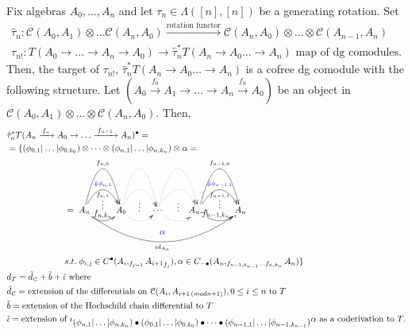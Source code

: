 %
%
\begin{eg}
\label{eg:pb5}
Fix algebras $A_0, \dots, A_n$ and let 
$\tau_n \in \Lambda([n],[n])$ 
be a generating rotation. Set
\begin{align*}
\hat{\tau}_n:
\mathcal{C}(A_0,A_1) \otimes 
\dots \mathcal{C}(A_n,A_0) 
\xrightarrow{\textrm{rotation functor}}
\mathcal{C}(A_n,A_0) \otimes 
\dots \otimes \mathcal{C}(A_{n-1},A_n)\\
\tau_{n!}: T(A_0 \to \dots \to A_n \to A_0)
\to \hat{\tau}_n^* T(A_n \to A_0 \dots \to A_n) 
\textrm{ map of dg comodules.}
\end{align*}
Then, the target of $\tau_{n!}$, 
$\hat{\tau}_n^* T(A_n \to A_0 \dots \to A_n)$ 
is a cofree dg comodule with the following 
structure. Let 
$(A_0 \xrightarrow{f_0} A_1 \to \dots \to 
A_n \xrightarrow{f_n} A_0)$ be an object 
in $\mathcal{C}(A_0,A_1) \otimes \dots \otimes 
\mathcal{C}(A_n, A_0)$. Then,
\begin{align*}
&\hat{\tau}_n^* 
  T(A_n \xrightarrow{f_n} A_0 \to \dots 
  \xrightarrow{f_{n-1}} A_n)^\bullet = \\
&= \{
  (\phi_{0,1}|\dots|\phi_{0,k_0}) \otimes \dots \otimes
  (\phi_{n,1}|\dots|\phi_{n,k_n}) \otimes \alpha = \\
&\phantom{moveovermove} =
  \xymatrix{
  A_n \ar@/^4pc/[r]^{f_{n,0}} 
  \ar@/^2pc/[r]^{\textcolor{blue}{\Downarrow \phi_{n,1}}}_{f_{n,1}} 
  \ar@/_1pc/[r]^{\substack{\textcolor{blue}{\vdots}\\ f_{n,k_n}}}
  \ar@/_3pc/[rrrr]^{\substack{\textcolor{blue}{\alpha} \\\\}}_{ id_{A_n}}
  & A_0 \ar@{.>}@/^4pc/[r] 
  \ar@{.>}@/^2pc/[r]_{\substack{\\ \\ \textcolor{blue}{\vdots}}} 
  \ar@{.>}@/_1pc/[r]
  & \cdots \ar@{.>}@/^4pc/[r] 
  \ar@{.>}@/^2pc/[r]_{\substack{\\ \\ \textcolor{blue}{\vdots}}} 
  \ar@{.>}@/_1pc/[r]
  & A_{n-1} \ar@/^4pc/[r]^{f_{n-1,0}} 
  \ar@/^2pc/[r]^{\textcolor{blue}{\Downarrow \phi_{n-1,1}}}_{f_{n-1,1}} 
  \ar@/_1pc/[r]^{\substack{\textcolor{blue}{\vdots}\\ f_{n-1,k_{n-1}}}}
  & A_n 
  }\\
&\phantom{moveovermove}
   s.t.\; \phi_{i,j} \in C^\bullet(A_i, _{f_{j-1}} {A_{i+1}}_{f_j}),
    \alpha \in C_{-\bullet}(A_n, _{f_{n-1,k_{n-1}}\dots f_{n,k_n}} A_n)\}\\
&d_{T} = 
  \tilde{d}_{\mathcal{C}} + \tilde{b} + \tilde{\iota} 
  \textrm{ where}\\
&\tilde{d}_{\mathcal{C}} = 
  \textrm{extension of the differentials on 
  $\mathcal{C}(A_i,A_{i+1 \, (mod n+1)}), 0 \leq i \leq n$ to $T$}\\
&\tilde{b} =
  \textrm{extension of the Hochschild chain differential to $T$}\\
&\tilde{\iota} = 
  \textrm{extension of $\iota_{\scriptstyle (\phi_{n,1}|\dots|\phi_{n,k_n}) \bullet (\phi_{0,1}|\dots|\phi_{0,k_0}) 
    \bullet \dots \bullet (\phi_{n-1,1}|\dots|\phi_{n-1,k_{n-1}}) } \alpha$ as a coderivation to $T$.}
\end{align*}
\end{eg}